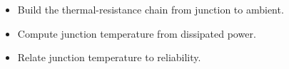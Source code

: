 \begin{objectives}
\begin{itemize}[leftmargin=1.4em,itemsep=2pt]
\item Build the thermal-resistance chain from junction to ambient.
\item Compute junction temperature from dissipated power.
\item Relate junction temperature to reliability.
\end{itemize}
\end{objectives}
